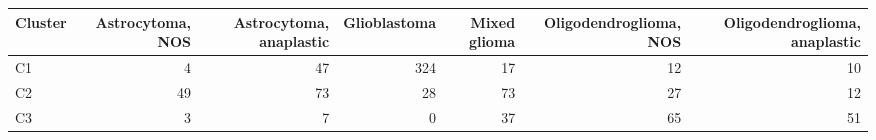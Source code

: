 \begin{tabular}{lrrrrrr}
\toprule
\textbf{Cluster} & \textbf{Astrocytoma, NOS} & \textbf{Astrocytoma, anaplastic} & \textbf{Glioblastoma} & \textbf{Mixed glioma} & \textbf{Oligodendroglioma, NOS} & \textbf{Oligodendroglioma, anaplastic} \\
\midrule
C1 & 4 & 47 & 324 & 17 & 12 & 10 \\
C2 & 49 & 73 & 28 & 73 & 27 & 12 \\
C3 & 3 & 7 & 0 & 37 & 65 & 51 \\
\bottomrule
\end{tabular}
